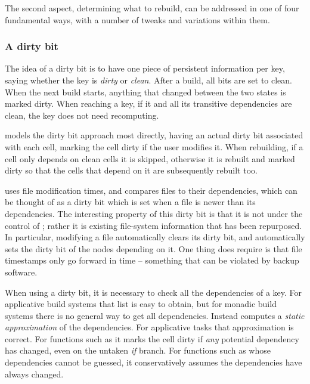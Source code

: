 The second aspect, determining what to rebuild, can be addressed in one of four
fundamental ways, with a number of tweaks and variations within them.

\vspace{-2mm}
\subsubsection{A dirty bit}\label{sec-dirty-bit}

The idea of a dirty bit is to have one piece of persistent
information per key, saying whether the key is
\emph{dirty} or \emph{clean}. After a build, all bits are set to clean. When the
next build starts, anything that changed between the two states is marked
dirty.
When reaching a key, if it and all its transitive dependencies are clean, the
key does not need recomputing.

\Excel models the dirty bit approach most directly, having an actual dirty bit
associated with each cell, marking the cell dirty if the user modifies it.
When rebuilding, if a cell only depends on clean cells it is skipped, otherwise
it is rebuilt and marked dirty so that the cells that depend on it are
subsequently rebuilt too.


\Make uses file modification times, and compares files to their
dependencies, which can be thought of as a dirty bit which is set when
a file is newer than its dependencies. The interesting property of
this dirty bit is that it is not under the control of \Make; rather it is
existing file-system information that has been repurposed. In particular,
modifying a file automatically clears its dirty bit, and
automatically sets the dirty bit of the nodes depending on it. One
thing \Make does require is that file timestamps only go forward in
time -- something that can be violated by backup software.

When using a dirty bit, it is necessary to check all the dependencies of a key.
For applicative build systems that list is easy to obtain, but for monadic
build systems there is no general way to get all dependencies. Instead \Excel
computes a \emph{static approximation} of the dependencies. For applicative
tasks that approximation is correct. For functions such as  it marks the
cell dirty if \emph{any} potential dependency has changed, even on the untaken
\emph{if} branch. For functions such as  whose dependencies cannot
be guessed, it conservatively assumes the dependencies have always changed.


